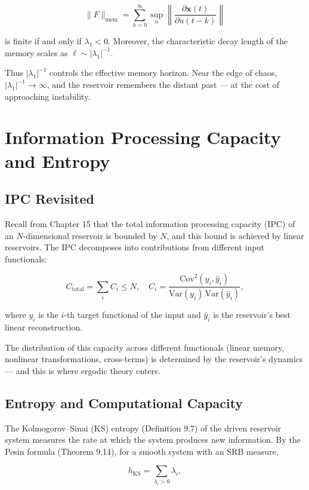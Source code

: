 \[
\|F\|_{\text{mem}} = \sum_{k=0}^{\infty} \sup_{u} \left\|\frac{\partial \mathbf{x}(t)}{\partial u(t-k)}\right\|
\]

is finite if and only if $\lambda_1 < 0$. Moreover, the characteristic decay length of the memory scales as $\ell \sim |\lambda_1|^{-1}$.

Thus $|\lambda_1|^{-1}$ controls the effective memory horizon. Near the edge of chaos, $|\lambda_1|^{-1} \to \infty$, and the reservoir remembers the distant past --- at the cost of approaching instability.


\bigskip


\section{Information Processing Capacity and Entropy}\label{sec:16.4}

\subsection{IPC Revisited}\label{sec:16.4.1}

Recall from Chapter 15 that the total information processing capacity (IPC) of an $N$-dimensional reservoir is bounded by $N$, and this bound is achieved by linear reservoirs. The IPC decomposes into contributions from different input functionals:

\[
C_{\text{total}} = \sum_i C_i \leq N, \quad C_i = \frac{\text{Cov}^2(y_i, \hat{y}_i)}{\text{Var}(y_i)\,\text{Var}(\hat{y}_i)},
\]

where $y_i$ is the $i$-th target functional of the input and $\hat{y}_i$ is the reservoir's best linear reconstruction.

The distribution of this capacity across different functionals (linear memory, nonlinear transformations, cross-terms) is determined by the reservoir's dynamics --- and this is where ergodic theory enters.

\subsection{Entropy and Computational Capacity}\label{sec:16.4.2}

The Kolmogorov--Sinai (KS) entropy (Definition 9.7) of the driven reservoir system measures the rate at which the system produces new information. By the Pesin formula (Theorem 9.14), for a smooth system with an SRB measure,

\[
h_{\text{KS}} = \sum_{\lambda_i > 0} \lambda_i,
\]

